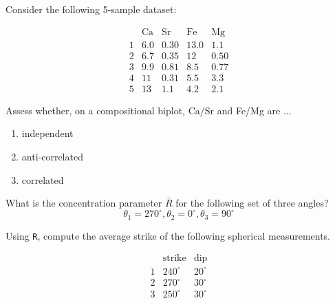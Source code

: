\documentclass{article}
\begin{document}
\vspace{1cm}

\begin{minipage}{12cm}

Consider the following 5-sample dataset:

\[
\begin{array}{c|cccc}
  ~ & \mbox{Ca} & \mbox{Sr} & \mbox{Fe} & \mbox{Mg} \\ \hline
  1 & 6.0 & 0.30 & 13.0 & 1.1 \\
  2 & 6.7 & 0.35 & 12 & 0.50 \\
  3 & 9.9 & 0.81 & 8.5 & 0.77 \\
  4 & 11 & 0.31 & 5.5 & 3.3 \\
  5 & 13 & 1.1 & 4.2 & 2.1
\end{array}
\]

Assess whether, on a compositional biplot, Ca/Sr and Fe/Mg are ...

\begin{enumerate}
\item independent
\item anti-correlated
\item correlated
\end{enumerate}

\end{minipage}

\vspace{1cm}

\begin{minipage}{12cm}

What is the concentration parameter \(\bar{R}\) for the following set of three angles?\\

\[\theta_1=270^\circ, \theta_2=0^\circ, \theta_3=90^\circ\]

\end{minipage}

\vspace{1cm}

\begin{minipage}{12cm}

Using \texttt{R}, compute the average strike of the following
spherical measurements.

\begin{equation*}
\begin{array}{c|cc}
& \mbox{strike} & \mbox{dip} \\ \hline
1 & 240^\circ & 20^\circ \\
2 & 270^\circ & 30^\circ \\
3 & 250^\circ & 30^\circ
\end{array}
\end{equation*}

\end{minipage}
\end{document}
